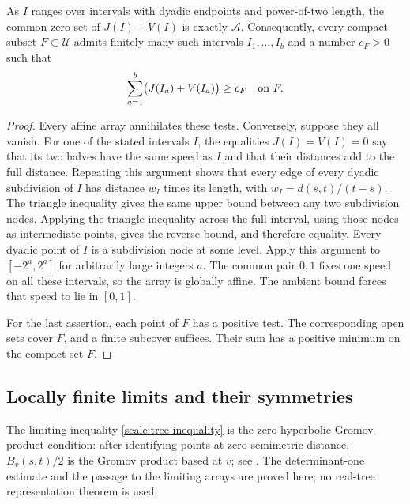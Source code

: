 \begin{lemma}\label{scale:affinity-tests}
As $I$ ranges over intervals with dyadic endpoints and power-of-two
length, the common zero set of $J(I)+V(I)$ is exactly $\mathcal A$.
Consequently, every compact subset $F\subset\mathcal U$ admits
finitely many such intervals $I_1,\ldots,I_b$ and a number $c_F>0$
such that
\begin{equation}\label{scale:finite-test-cover}
 \sum_{a=1}^{b}\bigl(J(I_a)+V(I_a)\bigr)\ge c_F
 \quad\hbox{on }F.
\end{equation}
\end{lemma}

\begin{proof}
Every affine array annihilates these tests. Conversely, suppose they
all vanish. For one of the stated intervals $I$, the equalities
$J(I)=V(I)=0$ say that its two halves have the same speed as $I$
and that their distances add to the full distance. Repeating this
argument shows that every edge of every dyadic subdivision of $I$
has distance $w_I$ times its length, with
$w_I=d(s,t)/(t-s)$. The triangle inequality gives the same upper
bound between any two subdivision nodes. Applying the triangle
inequality across the full interval, using those nodes as intermediate
points, gives the reverse bound, and therefore equality. Every dyadic
point of $I$ is a subdivision node at some level. Apply this argument
to $[-2^a,2^a]$ for arbitrarily large integers $a$. The common pair
$0,1$ fixes one speed on all these intervals, so the array is globally
affine. The ambient bound forces that speed to lie in $[0,1]$.

For the last assertion, each point of $F$ has a positive test. The
corresponding open sets cover $F$, and a finite subcover suffices.
Their sum has a positive minimum on the compact set $F$.
\end{proof}

\subsection{Locally finite limits and their symmetries}

The limiting inequality \cref{scale:tree-inequality} is the
zero-hyperbolic Gromov-product condition: after identifying points at
zero semimetric distance, $B_v(s,t)/2$ is the Gromov product based at $v$;
see \cite[Section~2.2, Definition~2.10]{Bestvina1997}.
The determinant-one estimate and the passage to the limiting arrays
are proved here; no real-tree representation theorem is used.


